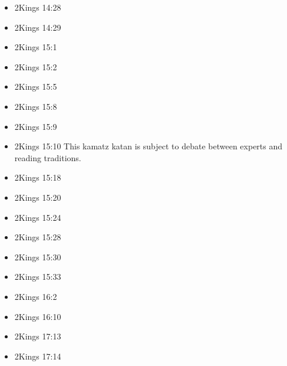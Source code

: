\documentclass[14pt]{article}
\begin{document}
\begin{multicols}{2}
\begin{itemize}
													\item 2Kings 14:28
													
													\item 2Kings 14:29
													
													\item 2Kings 15:1
													
													\item 2Kings 15:2
													
													\item 2Kings 15:5
													
													\item 2Kings 15:8
													
													\item 2Kings 15:9
													
													\item 2Kings 15:10 This kamatz katan is subject to debate between experts and reading traditions.
													
													\item 2Kings 15:18
													
													\item 2Kings 15:20
													
													\item 2Kings 15:24
													
													\item 2Kings 15:28
													
													\item 2Kings 15:30
													
													\item 2Kings 15:33
													
													\item 2Kings 16:2
													
													\item 2Kings 16:10
													
													\item 2Kings 17:13
													
													\item 2Kings 17:14
													

\end{itemize}
\end{multicols}
\end{document}
